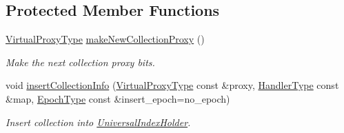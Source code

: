 \subsection*{Protected Member Functions}
\begin{DoxyCompactItemize}
\item 
\hyperlink{namespacevt_a1b417dd5d684f045bb58a0ede70045ac}{Virtual\+Proxy\+Type} \hyperlink{structvt_1_1vrt_1_1collection_1_1_collection_manager_a13988c17d12744b3229d380ccef5ec07}{make\+New\+Collection\+Proxy} ()
\begin{DoxyCompactList}\small\item\em Make the next collection proxy bits. \end{DoxyCompactList}\item 
void \hyperlink{structvt_1_1vrt_1_1collection_1_1_collection_manager_a71a055aa5cee6b18891ed946e03e4883}{insert\+Collection\+Info} (\hyperlink{namespacevt_a1b417dd5d684f045bb58a0ede70045ac}{Virtual\+Proxy\+Type} const \&proxy, \hyperlink{namespacevt_af64846b57dfcaf104da3ef6967917573}{Handler\+Type} const \&map, \hyperlink{namespacevt_a985a5adf291c34a3ca263b3378388236}{Epoch\+Type} const \&insert\+\_\+epoch=no\+\_\+epoch)
\begin{DoxyCompactList}\small\item\em Insert collection into {\ttfamily \hyperlink{structvt_1_1vrt_1_1collection_1_1_universal_index_holder}{Universal\+Index\+Holder}}. \end{DoxyCompactList}\end{DoxyCompactItemize}
